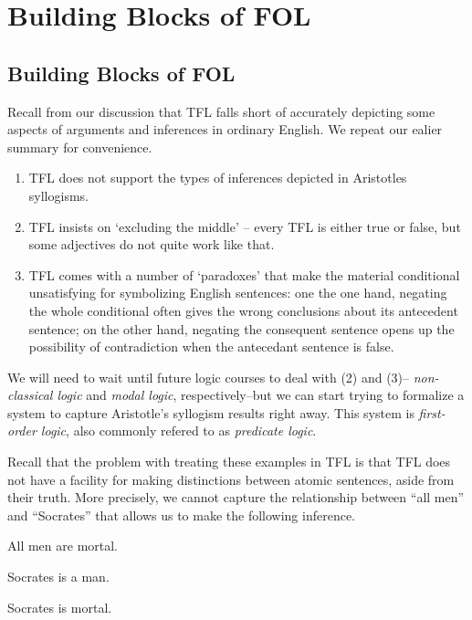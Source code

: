 
\section{Building Blocks of FOL}

\subsection{Building Blocks of FOL} \cite[][Chapter 23, pp. 190-8]{Mag25}

Recall from our discussion that TFL falls short of accurately depicting some
aspects of arguments and inferences in ordinary English. We repeat our ealier
summary for convenience.

\begin{enumerate}
\item TFL does not support the types of inferences depicted in Aristotles
  syllogisms.
\item TFL insists on `excluding the middle' -- every TFL is either true
  or false, but some adjectives do not quite work like that.
\item TFL comes with a number of `paradoxes' that make the material conditional
  unsatisfying for symbolizing English sentences: one the one hand, negating the
  whole conditional often gives the wrong conclusions about its antecedent
  sentence; on the other hand, negating the consequent sentence opens up the
  possibility of contradiction when the antecedant sentence is false.
\end{enumerate}

We will need to wait until future logic courses to deal with (2) and (3)--
\emph{non-classical logic} and \emph{modal logic}, respectively--but we can
start trying to formalize a system to capture Aristotle's syllogism results
right away. This system is \emph{first-order logic}, also commonly refered to
as \emph{predicate logic}.

Recall that the problem with treating these examples in TFL is that TFL does not
have a facility for making distinctions between atomic sentences, aside from
their truth. More precisely, we cannot capture the relationship between ``all
men'' and ``Socrates'' that allows us to make the following inference.

\begin{argument}
\item[ ] All men are mortal. 
\item[ ] Socrates is a man.
\item[\therefore] Socrates is mortal.
\end{argument}

